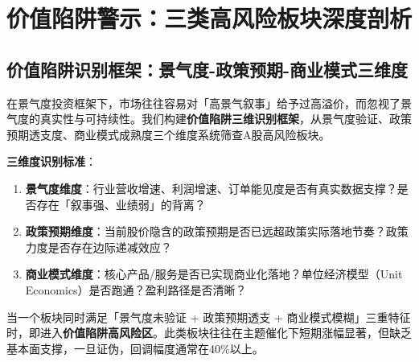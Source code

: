 
\chapter{价值陷阱警示：三类高风险板块深度剖析}
\label{ch:value-traps}

\section{价值陷阱识别框架：景气度-政策预期-商业模式三维度}

在景气度投资框架下，市场往往容易对「高景气叙事」给予过高溢价，而忽视了景气度的真实性与可持续性。我们构建\textbf{价值陷阱三维识别框架}，从景气度验证、政策预期透支度、商业模式成熟度三个维度系统筛查A股高风险板块。

\textbf{三维度识别标准}：

\begin{enumerate}[leftmargin=2em]
\item \textbf{景气度维度}：行业营收增速、利润增速、订单能见度是否有真实数据支撑？是否存在「叙事强、业绩弱」的背离？
\item \textbf{政策预期维度}：当前股价隐含的政策预期是否已远超政策实际落地节奏？政策力度是否存在边际递减效应？
\item \textbf{商业模式维度}：核心产品/服务是否已实现商业化落地？单位经济模型（Unit Economics）是否跑通？盈利路径是否清晰？
\end{enumerate}

当一个板块同时满足「景气度未验证 + 政策预期透支 + 商业模式模糊」三重特征时，即进入\textbf{价值陷阱高风险区}。此类板块往往在主题催化下短期涨幅显著，但缺乏基本面支撑，一旦证伪，回调幅度通常在40\%以上。

